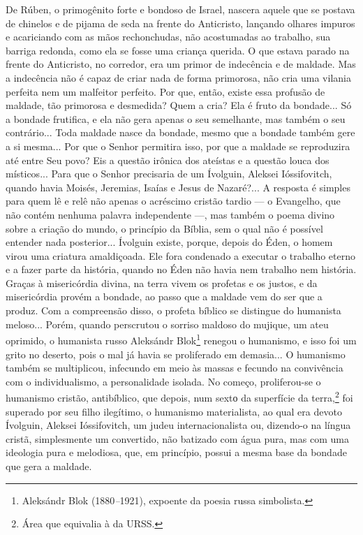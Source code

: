 De Rúben, o primogênito forte e bondoso de Israel, nascera aquele que se
postava de chinelos e de pijama de seda na frente do Anticristo,
lançando olhares impuros e acariciando com as mãos rechonchudas, não
acostumadas ao trabalho, sua barriga redonda, como ela se fosse uma
criança querida. O que estava parado na frente do Anticristo, no
corredor, era um primor de indecência e de maldade. Mas a indecência não
é capaz de criar nada de forma primorosa, não cria uma vilania perfeita
nem um malfeitor perfeito. Por que, então, existe essa profusão de
maldade, tão primorosa e desmedida? Quem a cria? Ela é fruto da
bondade... Só a bondade frutifica, e ela não gera apenas o seu
semelhante, mas também o seu contrário... Toda maldade nasce da bondade,
mesmo que a bondade também gere a si mesma... Por que o Senhor permitira
isso, por que a maldade se reproduzira até entre Seu povo? Eis a questão
irônica dos ateístas e a questão louca dos místicos... Para que o Senhor
precisaria de um Ívolguin, Aleksei Ióssifovitch, quando havia Moisés,
Jeremias, Isaías e Jesus de Nazaré?... A resposta é simples para quem lê
e relê não apenas o acréscimo cristão tardio --- o Evangelho, que não
contém nenhuma palavra independente ---, mas também o poema divino sobre
a criação do mundo, o princípio da Bíblia, sem o qual não é possível
entender nada posterior... Ívolguin existe, porque, depois do Éden, o
homem virou uma criatura amaldiçoada. Ele fora condenado a executar o
trabalho eterno e a fazer parte da história, quando no Éden não havia
nem trabalho nem história. Graças à misericórdia divina, na terra vivem
os profetas e os justos, e da misericórdia provém a bondade, ao passo
que a maldade vem do ser que a produz. Com a compreensão disso, o
profeta bíblico se distingue do humanista meloso... Porém, quando
perscrutou o sorriso maldoso do mujique, um ateu oprimido, o humanista
russo Aleksándr Blok\footnote{Aleksándr Blok (1880\emph{--}1921),
  expoente da poesia russa simbolista.} renegou o humanismo, e isso foi
um grito no deserto, pois o mal já havia se proliferado em demasia... O
humanismo também se multiplicou, infecundo em meio às massas e fecundo
na convivência com o individualismo, a personalidade isolada. No começo,
proliferou-se o humanismo cristão, antibíblico, que depois, num sextо da
superfície da terra,\footnote{Área que equivalia à da URSS.} foi
superado por seu filho ilegítimo, o humanismo materialista, ao qual era
devoto Ívolguin, Aleksei Ióssifovitch, um judeu internacionalista ou,
dizendo-o na língua cristã, simplesmente um convertido, não batizado com
água pura, mas com uma ideologia pura e melodiosa, que, em princípio,
possui a mesma base da bondade que gera a maldade.

